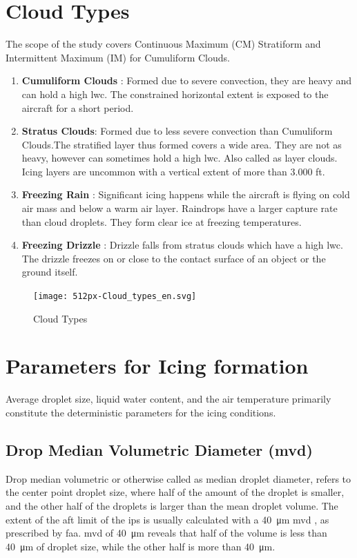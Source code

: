\documentclass[english]{kththesis}
\begin{document}
\section{Cloud Types}
\label{sec:cloudtypes}
The scope of the study covers Continuous Maximum (CM) Stratiform and Intermittent Maximum (IM) for Cumuliform Clouds.
\begin{enumerate}
\item \textbf{Cumuliform Clouds} : Formed due to severe convection, they are heavy and can hold a high \acrshort{lwc}. The constrained horizontal extent is exposed to the aircraft for a short period.
\item \textbf{Stratus Clouds}: Formed due to less severe convection than Cumuliform Clouds.The stratified layer thus formed covers a wide area. They are not as heavy, however can sometimes hold a high \acrshort{lwc}. Also called as layer clouds. Icing layers are uncommon with a vertical extent of more than 3.000 ft.
\item \textbf{Freezing Rain} : Significant icing happens while the aircraft is flying on cold air mass and below a warm air layer. Raindrops have a larger capture rate than cloud droplets. They form clear ice at freezing temperatures.
\item \textbf{Freezing Drizzle} : Drizzle falls from stratus clouds which have a high \acrshort{lwc}. The drizzle freezes on or close to the contact surface of an object or the ground itself.
\end{enumerate}

\begin{figure}[!ht]
    \centering
\graphicspath{ {IPS/} }
\texttt{[image: 512px-Cloud\_types\_en.svg]}
\caption{Cloud Types \cite{Habashi2004}}
\label{fig:CloudT}
\end{figure}

\section{Parameters for Icing formation}
\label{sec:iceparameters}
Average droplet size, liquid water content, and the air temperature primarily constitute the deterministic parameters
for the icing conditions. 
\subsection{Drop Median Volumetric Diameter (\acrshort{mvd})}
\label{subsec:medvoldia}
Drop median volumetric or otherwise called as median droplet diameter, refers to the center point droplet size, where half of the amount of the droplet is smaller, and the other half of the droplets is larger than the mean droplet volume. The extent of the aft limit of the \acrshort{ips} is usually calculated with a \SI{40}{\micro\metre} \acrshort{mvd} , as prescribed by \acrshort{faa}. \acrshort{mvd} of \SI{40}{\micro\metre} reveals that half of the volume is less than \SI{40}{\micro\metre} of droplet size, while the other half is more than \SI{40}{\micro\metre}\cite{Heinrich1991}.
\end{document}
